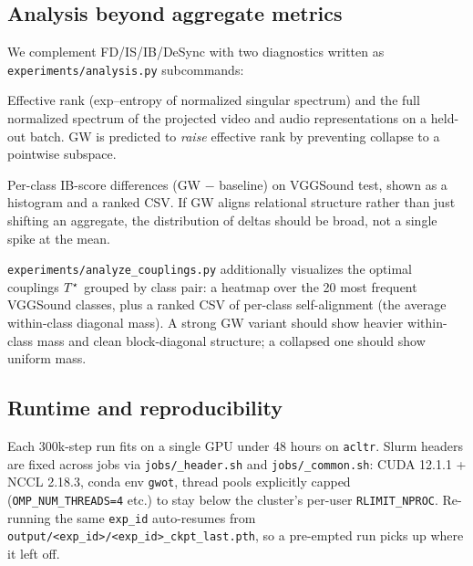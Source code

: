 \subsection{Analysis beyond aggregate metrics}
\label{sec:experiments:analysis}
We complement FD/IS/IB/DeSync with two diagnostics written as
\texttt{experiments/analysis.py} subcommands:
\begin{description}[leftmargin=2em]
  \item[\texttt{geometry}] Effective rank
    (exp--entropy of normalized singular spectrum) and the full
    normalized spectrum of the projected video and audio
    representations on a held-out batch. GW is predicted to
    \emph{raise} effective rank by preventing collapse to a
    pointwise subspace.
  \item[\texttt{perclass}] Per-class IB-score differences
    (GW $-$ baseline) on VGGSound test, shown as a histogram and
    a ranked CSV. If GW aligns relational structure rather than
    just shifting an aggregate, the distribution of deltas should
    be broad, not a single spike at the mean.
\end{description}
\texttt{experiments/analyze\_couplings.py} additionally visualizes
the optimal couplings $T^{\star}$ grouped by class pair: a heatmap
over the 20 most frequent VGGSound classes, plus a ranked CSV of
per-class self-alignment (the average within-class diagonal
mass). A strong GW variant should show heavier within-class mass
and clean block-diagonal structure; a collapsed one should show
uniform mass.

\subsection{Runtime and reproducibility}
Each 300k-step run fits on a single GPU under 48 hours on
\texttt{acltr}. Slurm headers are fixed across jobs via
\texttt{jobs/\_header.sh} and \texttt{jobs/\_common.sh}: CUDA
12.1.1 + NCCL 2.18.3, conda env \texttt{gwot}, thread pools
explicitly capped (\texttt{OMP\_NUM\_THREADS=4} etc.) to stay
below the cluster's per-user \texttt{RLIMIT\_NPROC}. Re-running
the same \texttt{exp\_id} auto-resumes from
\texttt{output/<exp\_id>/<exp\_id>\_ckpt\_last.pth}, so a
pre-empted run picks up where it left off.
